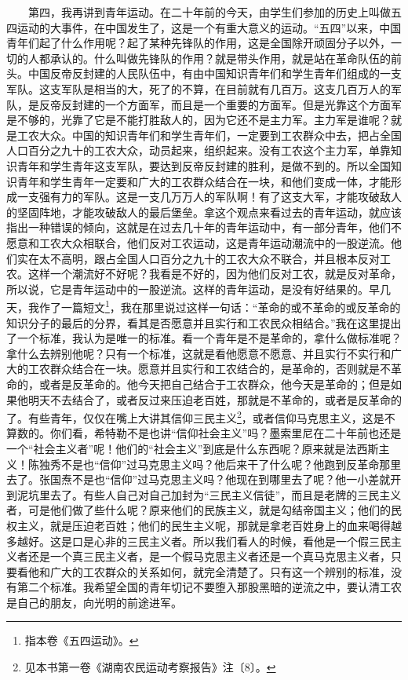 \documentclass[cn,11pt,chinese]{elegantbook}
\begin{document}
　　第四，我再讲到青年运动。在二十年前的今天，由学生们参加的历史上叫做五四运动的大事件，在中国发生了，这是一个有重大意义的运动。“五四”以来，中国青年们起了什么作用呢？起了某种先锋队的作用，这是全国除开顽固分子以外，一切的人都承认的。什么叫做先锋队的作用？就是带头作用，就是站在革命队伍的前头。中国反帝反封建的人民队伍中，有由中国知识青年们和学生青年们组成的一支军队。这支军队是相当的大，死了的不算，在目前就有几百万。这支几百万人的军队，是反帝反封建的一个方面军，而且是一个重要的方面军。但是光靠这个方面军是不够的，光靠了它是不能打胜敌人的，因为它还不是主力军。主力军是谁呢？就是工农大众。中国的知识青年们和学生青年们，一定要到工农群众中去，把占全国人口百分之九十的工农大众，动员起来，组织起来。没有工农这个主力军，单靠知识青年和学生青年这支军队，要达到反帝反封建的胜利，是做不到的。所以全国知识青年和学生青年一定要和广大的工农群众结合在一块，和他们变成一体，才能形成一支强有力的军队。这是一支几万万人的军队啊！有了这支大军，才能攻破敌人的坚固阵地，才能攻破敌人的最后堡垒。拿这个观点来看过去的青年运动，就应该指出一种错误的倾向，这就是在过去几十年的青年运动中，有一部分青年，他们不愿意和工农大众相联合，他们反对工农运动，这是青年运动潮流中的一股逆流。他们实在太不高明，跟占全国人口百分之九十的工农大众不联合，并且根本反对工农。这样一个潮流好不好呢？我看是不好的，因为他们反对工农，就是反对革命，所以说，它是青年运动中的一股逆流。这样的青年运动，是没有好结果的。早几天，我作了一篇短文\footnote[10]{ 指本卷《五四运动》。}，我在那里说过这样一句话：“革命的或不革命的或反革命的知识分子的最后的分界，看其是否愿意并且实行和工农民众相结合。”我在这里提出了一个标准，我认为是唯一的标准。看一个青年是不是革命的，拿什么做标准呢？拿什么去辨别他呢？只有一个标准，这就是看他愿意不愿意、并且实行不实行和广大的工农群众结合在一块。愿意并且实行和工农结合的，是革命的，否则就是不革命的，或者是反革命的。他今天把自己结合于工农群众，他今天是革命的；但是如果他明天不去结合了，或者反过来压迫老百姓，那就是不革命的，或者是反革命的了。有些青年，仅仅在嘴上大讲其信仰三民主义\footnote[11]{ 见本书第一卷《湖南农民运动考察报告》注〔8〕。}，或者信仰马克思主义，这是不算数的。你们看，希特勒不是也讲“信仰社会主义”吗？墨索里尼在二十年前也还是一个“社会主义者”呢！他们的“社会主义”到底是什么东西呢？原来就是法西斯主义！陈独秀不是也“信仰”过马克思主义吗？他后来干了什么呢？他跑到反革命那里去了。张国焘不是也“信仰”过马克思主义吗？他现在到哪里去了呢？他一小差就开到泥坑里去了。有些人自己对自己加封为“三民主义信徒”，而且是老牌的三民主义者，可是他们做了些什么呢？原来他们的民族主义，就是勾结帝国主义；他们的民权主义，就是压迫老百姓；他们的民生主义呢，那就是拿老百姓身上的血来喝得越多越好。这是口是心非的三民主义者。所以我们看人的时候，看他是一个假三民主义者还是一个真三民主义者，是一个假马克思主义者还是一个真马克思主义者，只要看他和广大的工农群众的关系如何，就完全清楚了。只有这一个辨别的标准，没有第二个标准。我希望全国的青年切记不要堕入那股黑暗的逆流之中，要认清工农是自己的朋友，向光明的前途进军。\\
\end{document}
